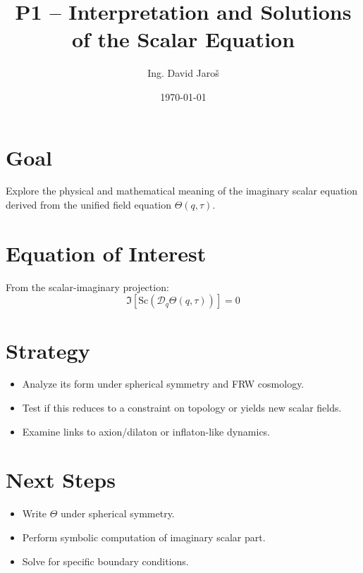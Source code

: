 \documentclass[12pt]{article}
\title{P1 – Interpretation and Solutions of the Scalar Equation}
\author{Ing. David Jaroš}
\date{\today}
\begin{document}
\maketitle

\section*{Goal}
Explore the physical and mathematical meaning of the imaginary scalar equation derived from the unified field equation $\Theta(q, \tau)$.

\section*{Equation of Interest}
From the scalar-imaginary projection:
\[
\Im[\text{Sc}(\mathcal{D}_q \Theta(q, \tau))] = 0
\]

\section*{Strategy}
\begin{itemize}
\item Analyze its form under spherical symmetry and FRW cosmology.
\item Test if this reduces to a constraint on topology or yields new scalar fields.
\item Examine links to axion/dilaton or inflaton-like dynamics.
\end{itemize}

\section*{Next Steps}
\begin{itemize}
\item Write $\Theta$ under spherical symmetry.
\item Perform symbolic computation of imaginary scalar part.
\item Solve for specific boundary conditions.
\end{itemize}
\end{document}
